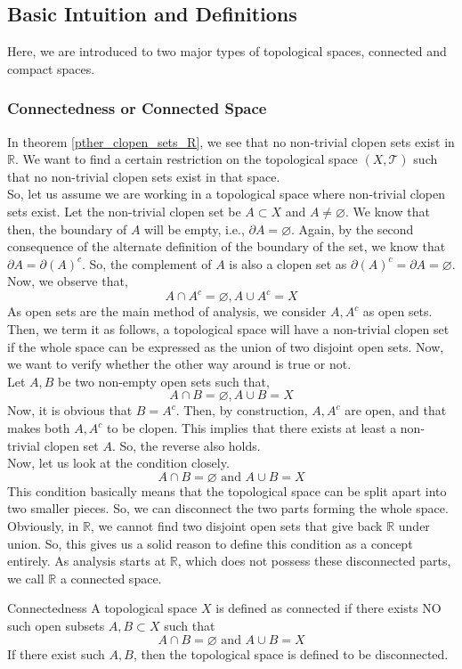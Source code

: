 \subsection{Basic Intuition and Definitions}
Here, we are introduced to two major types of topological spaces, connected and compact spaces.
\subsubsection{Connectedness or Connected Space}
In theorem \eqref{pther_clopen_sets_R}, we see that no non-trivial clopen sets exist in $\mathbb{R}$. We want to find a certain restriction on the topological space $(X,\mathcal{T})$ such that no non-trivial clopen sets exist in that space.\\
So, let us assume we are working in a topological space where non-trivial clopen sets exist. Let the non-trivial clopen set be $A\subset X$ and $A\neq\varnothing$. We know that then, the boundary of $A$ will be empty, i.e., $\partial A=\varnothing$. Again, by the second consequence of the alternate definition of the boundary of the set, we know that $\partial A=\partial(A)^c$. So, the complement of $A$ is also a clopen set as $\partial(A)^c=\partial A=\varnothing$. Now, we observe that, $$A\cap A^c=\varnothing,A\cup A^c=X$$ 
As open sets are the main method of analysis, we consider $A, A^c$ as open sets. Then, we term it as follows, a topological space will have a non-trivial clopen set if the whole space can be expressed as the union of two disjoint open sets. Now, we want to verify whether the other way around is true or not.\\
Let $A, B$ be two non-empty open sets such that, $$A\cap B=\varnothing, A\cup B=X$$
Now, it is obvious that $B=A^c$. Then, by construction, $A, A^c$ are open, and that makes both $A, A^c$ to be clopen. This implies that there exists at least a non-trivial clopen set $A$. So, the reverse also holds.\\
Now, let us look at the condition closely.
$$A\cap B=\varnothing\text{ and } A\cup B=X$$
This condition basically means that the topological space can be split apart into two smaller pieces. So, we can disconnect the two parts forming the whole space. Obviously, in $\mathbb{R}$, we cannot find two disjoint open sets that give back $\mathbb{R}$ under union. So, this gives us a solid reason to define this condition as a concept entirely. As analysis starts at $\mathbb{R}$, which does not possess these disconnected parts, we call $\mathbb{R}$ a connected space.
\begin{Definition}{Connectedness}\label{connectedness}
    A topological space $X$ is defined as connected if there exists NO such open subsets $A, B\subset X$ such that $$A\cap B=\varnothing\text{ and }A\cup B=X$$
    If there exist such $A, B$, then the topological space is defined to be disconnected.
\end{Definition}
